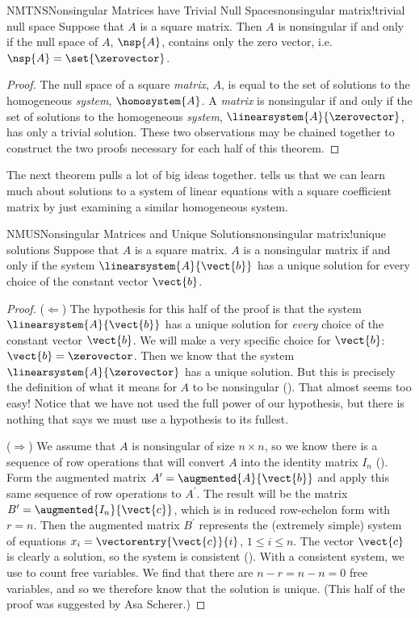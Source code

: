 %
\begin{theorem}{NMTNS}{Nonsingular Matrices have Trivial Null Spaces}{nonsingular matrix!trivial null space}
Suppose that $A$ is a square matrix.  Then $A$ is nonsingular if and only if the null space of $A$, $\nsp{A}$, contains only the zero vector, i.e.\ $\nsp{A}=\set{\zerovector}$. 
\end{theorem}
%
\begin{proof}
The null space of a square {\em matrix}, $A$, is equal to the set of solutions to the homogeneous {\em system}, $\homosystem{A}$.  A {\em matrix} is nonsingular if and only if the set of solutions to the homogeneous {\em system}, $\linearsystem{A}{\zerovector}$, has only a trivial solution.  These two observations may be chained together to construct the two proofs necessary for each half of this theorem.
\end{proof}
%
The next theorem pulls a lot of big ideas together.  
 tells us that we can learn much about solutions to a system of linear equations with a square coefficient matrix by just examining a similar homogeneous system.
%
\begin{theorem}{NMUS}{Nonsingular Matrices and Unique Solutions}{nonsingular matrix!unique solutions}
Suppose that $A$ is a square matrix.  $A$ is a nonsingular matrix if and only if the system $\linearsystem{A}{\vect{b}}$ has a unique solution for every choice of the constant vector $\vect{b}$.
\end{theorem}
%
\begin{proof}
($\Leftarrow$)  The hypothesis for this half of the proof is that the system $\linearsystem{A}{\vect{b}}$ has a unique solution for {\em every} choice of the constant vector $\vect{b}$.  We will make a very specific choice for $\vect{b}$:  $\vect{b}=\zerovector$.  Then we know that the system $\linearsystem{A}{\zerovector}$ has a unique solution.  But this is precisely the definition of what it means for $A$ to be nonsingular ().  That almost seems too easy!  Notice that we have not used the full power of our hypothesis, but there is nothing that says we must use a hypothesis to its fullest.\par
%
($\Rightarrow$)  We assume that $A$ is nonsingular of size $n\times n$, so we know there is a sequence of row operations that will convert $A$ into the identity matrix $I_n$ ().  Form the augmented matrix $A^\prime=\augmented{A}{\vect{b}}$ and apply this same sequence of row operations to $A^\prime$.  The result will be the matrix $B^\prime=\augmented{I_n}{\vect{c}}$, which is in reduced row-echelon form with $r=n$.  Then the augmented matrix $B^\prime$ represents the (extremely simple) system of equations $x_i=\vectorentry{\vect{c}}{i}$, $1\leq i\leq n$.  The vector $\vect{c}$ is clearly a solution, so the system is consistent ().  With a consistent system, we use  to count free variables.  We find that there are $n-r=n-n=0$ free variables, and so we therefore know that the solution is unique.  (This half of the proof was suggested by Asa Scherer.)\par
%
\end{proof}

